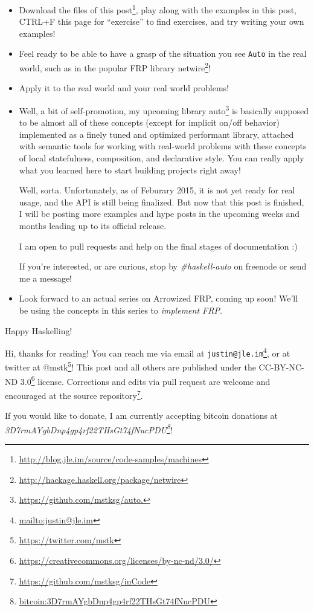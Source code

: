 \documentclass[]{article}
\renewcommand{\href}[2]{#2\footnote{\url{#1}}}
\begin{document}
\begin{itemize}
\item
  \href{http://blog.jle.im/source/code-samples/machines}{Download the files of
  this post}, play along with the examples in this post, CTRL+F this page for
  ``exercise'' to find exercises, and try writing your own examples!
\item
  Feel ready to be able to have a grasp of the situation you see \texttt{Auto}
  in the real world, such as in the popular FRP library
  \href{http://hackage.haskell.org/package/netwire}{netwire}!
\item
  Apply it to the real world and your real world problems!
\item
  Well, a bit of self-promotion, my upcoming library
  \href{https://github.com/mstksg/auto.}{auto} is basically supposed to be
  almost all of these concepts (except for implicit on/off behavior) implemented
  as a finely tuned and optimized performant library, attached with semantic
  tools for working with real-world problems with these concepts of local
  statefulness, composition, and declarative style. You can really apply what
  you learned here to start building projects right away!

  Well, sorta. Unfortunately, as of Feburary 2015, it is not yet ready for real
  usage, and the API is still being finalized. But now that this post is
  finished, I will be posting more examples and hype posts in the upcoming weeks
  and months leading up to its official release.

  I am open to pull requests and help on the final stages of documentation :)

  If you're interested, or are curious, stop by \emph{\#haskell-auto} on
  freenode or send me a message!
\item
  Look forward to an actual series on Arrowized FRP, coming up soon! We'll be
  using the concepts in this series to \emph{implement FRP}.
\end{itemize}

Happy Haskelling!

Hi, thanks for reading! You can reach me via email at
\href{mailto:justin@jle.im}{\nolinkurl{justin@jle.im}}, or at twitter at
\href{https://twitter.com/mstk}{@mstk}! This post and all others are published
under the \href{https://creativecommons.org/licenses/by-nc-nd/3.0/}{CC-BY-NC-ND
3.0} license. Corrections and edits via pull request are welcome and encouraged
at \href{https://github.com/mstksg/inCode}{the source repository}.

If you would like to donate, I am currently accepting bitcoin donations at
\emph{\href{bitcoin:3D7rmAYgbDnp4gp4rf22THsGt74fNucPDU}{3D7rmAYgbDnp4gp4rf22THsGt74fNucPDU}}!
\end{document}
